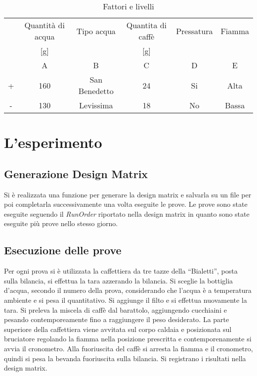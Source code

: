 \begin{table}[htb]
  \caption{Fattori e livelli}
  \label{tab:factorLvl}
  \begin{tabular}{cccccc}
    \hline
    & Quantità di acqua & Tipo acqua & Quantita di caffè & Pressatura & Fiamma\\
    & [g] &  & [g] &  & \\
    \hline
    & A &B&C&D&E\\
    \hline
  + & 160 & San Benedetto & 24 & Si & Alta\\
  - & 130 & Levissima & 18 & No & Bassa\\
  \hline
  \end{tabular}
\end{table}
\newpage
\section{L'esperimento}
\subsection{Generazione Design Matrix}
Si è realizzata una funzione per generare la design matrix e salvarla su un file per poi completarla successivamente una volta eseguite le prove.
Le prove sono state eseguite seguendo il \emph{RunOrder} riportato nella design matrix in quanto sono state eseguite più prove nello stesso giorno.
\subsection{Esecuzione delle prove}
Per ogni prova si è utilizzata la caffettiera da tre tazze della “Bialetti”, posta sulla bilancia, si effettua la tara azzerando la bilancia. Si sceglie la bottiglia d'acqua, secondo il numero della prova, considerando che l'acqua è a temperatura ambiente e si pesa il quantitativo. Si aggiunge il filto e si effettua nuovamente la tara.
Si preleva la miscela di caffè dal barattolo, aggiungendo cucchiaini e pesando contemporeamente fino a raggiungere il peso desiderato.
La parte superiore della caffettiera viene avvitata sul corpo caldaia e posizionata sul bruciatore regolando la fiamma nella posizione prescritta e contemporenamente si avvia il cronometro.
Alla fuoriuscita del caffè si arresta la fiamma e il cronometro, quindi si pesa la bevanda fuoriuscita sulla bilancia.
Si registrano i risultati nella design matrix.
